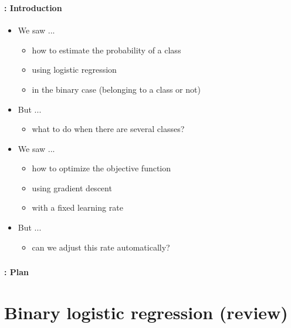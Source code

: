 \documentclass[xcolor=table]{beamer}
\subtitle[MultiReg. \& AdaGrad]{Multinomial regression and AdaGrad}
\begin{document}
	
\begin{frame}
	\frametitle{\inserttitle}
	\framesubtitle{\insertshortsubtitle: Introduction}
	
	\begin{itemize}
		\item We saw ...
		\begin{itemize}
			\item how to estimate the probability of a class
			\item using logistic regression
			\item in the binary case (belonging to a class or not)
		\end{itemize}
		\item But ...
		\begin{itemize}
			\item what to do when there are several classes?
		\end{itemize}
		\item We saw ...
		\begin{itemize}
			\item how to optimize the objective function
			\item using gradient descent
			\item with a fixed learning rate
		\end{itemize}
		\item But ...
		\begin{itemize}
			\item can we adjust this rate automatically?
		\end{itemize}
	\end{itemize}
\end{frame}


\begin{frame}
	\frametitle{\inserttitle}
	\framesubtitle{\insertshortsubtitle: Plan}
	
	\begin{multicols}{2}
		\tableofcontents
	\end{multicols}
\end{frame}

\section{Binary logistic regression (review)}

\begin{frame}
	\frametitle{\insertshortsubtitle}
	\framesubtitle{\insertsection}
	
	
\end{frame}
\end{document}
